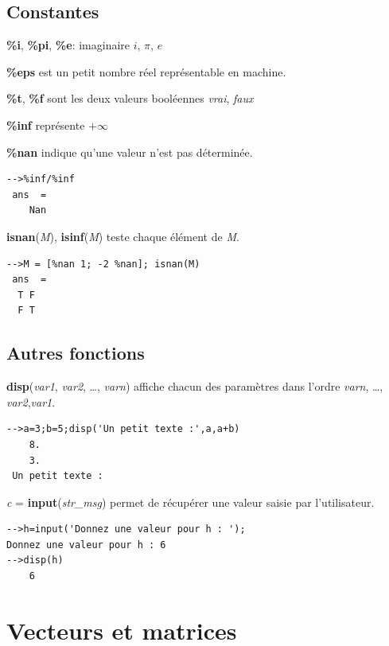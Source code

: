 \documentclass{article}
\begin{document}
\begin{multicols}{3}
\subsection{Constantes}
\label{constantes}
\begin{description}
\item{\textbf{\%i}, \textbf{\%pi}, \textbf{\%e}}:  imaginaire $i$, $\pi$, $e$
\item{\textbf{\%eps}} est un petit nombre réel représentable en machine.
\item {\textbf{\%t}, \textbf{\%f}} sont les deux valeurs booléennes \textit{vrai}, \textit{faux}
\item {\textbf{\%inf}} représente $+\infty$ 
\item {\textbf{\%nan}}  indique qu'une valeur n'est pas déterminée.
\begin{verbatim}
-->%inf/%inf
 ans  =
    Nan
\end{verbatim}
\item {\textbf{isnan}(\textit{M}), \textbf{isinf}(\textit{M})} teste chaque élément de \textit{M}.
\begin{verbatim} 
-->M = [%nan 1; -2 %nan]; isnan(M)
 ans  =
  T F  
  F T 
  \end{verbatim}
\end{description}
\subsection{Autres fonctions}
\label{autres}
\begin{description}
\item\label{disp}{\textbf{disp}(\textit{var1}, \textit{var2}, \ldots, \textit{varn})} affiche chacun des paramètres dans l'ordre \textit{varn}, \ldots, \textit{var2},\textit{var1}.
\begin{verbatim}
-->a=3;b=5;disp('Un petit texte :',a,a+b)
    8.  
    3.  
 Un petit texte : 
\end{verbatim}
\item\label{input}{\textit{c} = \textbf{input}(\textit{str\_msg})} permet de récupérer une valeur saisie par l'utilisateur.
\begin{verbatim}
-->h=input('Donnez une valeur pour h : ');
Donnez une valeur pour h : 6
-->disp(h)
    6
\end{verbatim}
\end{description}

\section{Vecteurs et matrices}

\end{multicols}
\end{document}
